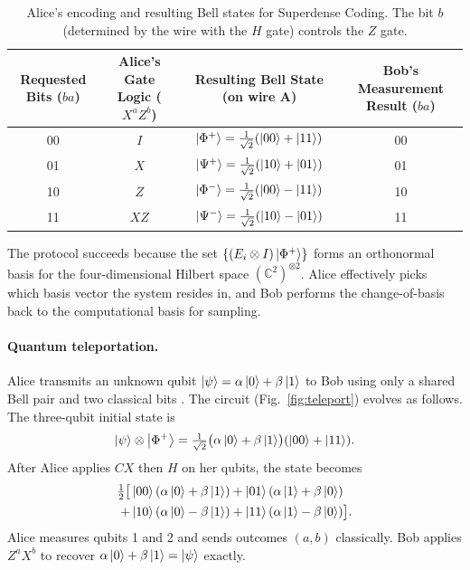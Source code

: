 \documentclass[aps, reprint, twocolumn, superscriptaddress, floatfix]{revtex4-2}
\begin{document}
\begin{table}[t]
\centering
\caption{Alice's encoding and resulting Bell states for Superdense Coding. The bit $b$ (determined by the wire with the $H$ gate) controls the $Z$ gate.}
\label{tab:superdense}
\begin{tabular}{@{}cccc@{}}
\toprule
Requested Bits ($ba$) & Alice's Gate Logic ($X^a Z^b$) & Resulting Bell State (on wire A) & Bob's Measurement Result ($ba$) \\ \midrule
00 & $I$  & $\ket{\Phi^+} = \tfrac{1}{\sqrt{2}}(\ket{00}+\ket{11})$ & 00 \\
01 & $X$  & $\ket{\Psi^+} = \tfrac{1}{\sqrt{2}}(\ket{10}+\ket{01})$ & 01 \\
10 & $Z$  & $\ket{\Phi^-} = \tfrac{1}{\sqrt{2}}(\ket{00}-\ket{11})$ & 10 \\
11 & $XZ$ & $\ket{\Psi^-} = \tfrac{1}{\sqrt{2}}(\ket{10}-\ket{01})$ & 11 \\ \bottomrule
\end{tabular}
\end{table}

The protocol succeeds because the set $\{ (E_i \otimes I) \ket{\Phi^+} \}$ forms an 
orthonormal basis for the four-dimensional Hilbert space $(\mathbb{C}^2)^{\otimes 2}$.
Alice effectively picks which basis vector the system resides in, and Bob performs
the change-of-basis back to the computational basis for sampling.


\paragraph{Quantum teleportation.}
Alice transmits an unknown qubit $\ket{\psi}=\alpha\ket{0}+\beta\ket{1}$ to Bob
using only a shared Bell pair and two classical bits \cite{bennett1993teleporting}.
The circuit (Fig.~\ref{fig:teleport}) evolves as follows.  The three-qubit
initial state is
\begin{equation}
  \ket{\psi}\otimes\ket{\Phi^+}
  = \tfrac{1}{\sqrt{2}}\bigl(\alpha\ket{0}+\beta\ket{1}\bigr)(\ket{00}+\ket{11}).
\end{equation}
After Alice applies $CX$ then $H$ on her qubits, the state becomes
\begin{align}
  \tfrac{1}{2}\bigl[&\ket{00}(\alpha\ket{0}+\beta\ket{1})
                    +\ket{01}(\alpha\ket{1}+\beta\ket{0}) \nonumber\\
                   +&\ket{10}(\alpha\ket{0}-\beta\ket{1})
                    +\ket{11}(\alpha\ket{1}-\beta\ket{0})\bigr].
\end{align}
Alice measures qubits 1 and 2 and sends outcomes $(a,b)$ classically.  Bob applies
$Z^a X^b$ to recover $\alpha\ket{0}+\beta\ket{1}=\ket{\psi}$ exactly.
\end{document}
